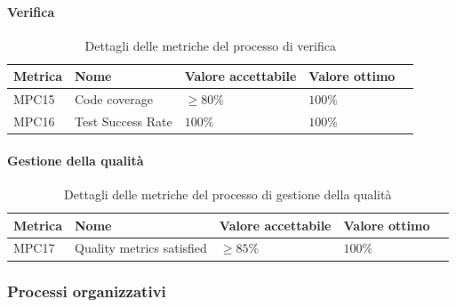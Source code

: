 \documentclass[a4paper,12pt]{article}
\begin{document}
{{{            \paragraph{Verifica}
            \leavevmode
                \begin{table}[H]
                \centering
                    \begin{tabular}{|l|l|l|l|l|}
                        \hline
                        \rowcolor{gold}
                        \textbf{Metrica} & \textbf{Nome} & \textbf{Valore accettabile} & \textbf{Valore ottimo} \\
                        \hline
                        MPC15 & Code coverage & $\ge 80\%$ & $100\%$ \\
                        \hline
                        MPC16 & Test Success Rate & $100\%$ & $100\%$ \\
                        \hline
                    \end{tabular}
                    \caption{Dettagli delle metriche del processo di verifica} 
                    \label{tab:metriche-verifica}
                \end{table}
            
            \paragraph{Gestione della qualità}
            \leavevmode
                \begin{table}[H]
                \centering
                    \begin{tabular}{|l|l|l|l|l|}
                        \hline
                        \rowcolor{gold}
                        \textbf{Metrica} & \textbf{Nome} & \textbf{Valore accettabile} & \textbf{Valore ottimo} \\
                        \hline
                        MPC17 & Quality metrics satisfied & $\ge 85\%$ & $100\%$ \\
                        \hline
                    \end{tabular}
                    \caption{Dettagli delle metriche del processo di gestione della qualità} 
                    \label{tab:metriche-qualità}
                \end{table}
        }

        \subsubsection{Processi organizzativi}{
       
}}}
\end{document}
